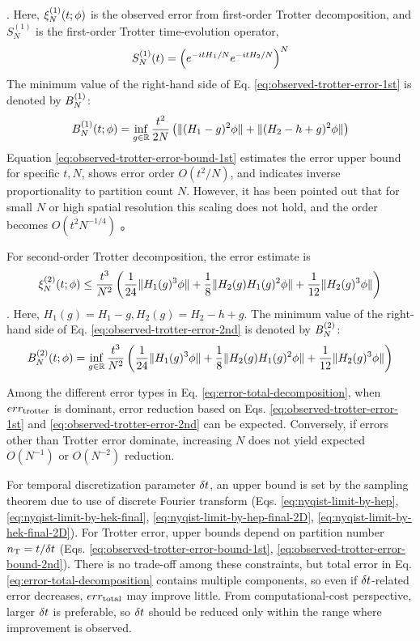 \documentclass[a4paper,11pt]{article}
\begin{document}
\cite{Burgarth2024.PhysRevResearch.6.043155}. Here,
$\xi_{N}^{(1)}(t;\phi)$ is the observed error from first-order Trotter
decomposition, and $S_N^{(1)}$ is the first-order Trotter time-evolution
operator,
\begin{equation}
    S_{N}^{(1)}(t)=\left(e^{-i{tH}_1/N}e^{-itH_2/N}\right)^N
\end{equation}
The minimum value of the right-hand side of
Eq. \eqref{eq:observed-trotter-error-1st} is denoted by $B_{N}^{(1)}$:
\begin{equation}
B_{N}^{(1)}(t;\phi)=\inf_{g\in\mathbb{R}}\frac{t^2}{2N}
    \left(\|(H_1-g)^2\phi\|+\|(H_2-h+g)^2\phi\|\right)
\label{eq:observed-trotter-error-bound-1st}
\end{equation}
Equation \eqref{eq:observed-trotter-error-bound-1st} estimates the error upper
bound for specific $t,N$, shows error order $O(t^2/N)$, and indicates inverse
proportionality to partition count $N$. However, it has been pointed out that
for small $N$ or high spatial resolution this scaling does not hold, and the
order becomes $O(t^2 N^{-1/4})$
\cite{Burgarth2024.PhysRevResearch.6.043155}。

For second-order Trotter decomposition, the error estimate is
\begin{equation}
  \xi_{N}^{(2)}(t;\phi)\leq\frac{t^3}{N^2}\left(\frac{1}{24}\|H_1(g)^3\phi\| + \frac{1}{8}\|H_2(g)H_1(g)^2\phi\|
  +\frac{1}{12}\|H_2(g)^3\phi\|\right)
    \label{eq:observed-trotter-error-2nd}
\end{equation}
\cite{Burgarth2024.PhysRevResearch.6.043155}. Here,
$H_1(g)=H_1-g,H_2(g)=H_2-h+g$.
The minimum value of the right-hand side of
Eq. \eqref{eq:observed-trotter-error-2nd} is denoted by $B_{N}^{(2)}$:
\begin{equation}
B_{N}^{(2)}(t;\phi)=\inf_{g\in\mathbb{R}}\frac{t^3}{N^2}
    \left(\frac{1}{24}\|H_1(g)^3\phi\| + \frac{1}{8}\|H_2(g)H_1(g)^2\phi\|
  +\frac{1}{12}\|H_2(g)^3\phi\|\right)
\label{eq:observed-trotter-error-bound-2nd}
\end{equation}

Among the different error types in Eq. \eqref{eq:error-total-decomposition},
when $err_{\mathrm{trotter}}$ is dominant, error reduction based on
Eqs. \eqref{eq:observed-trotter-error-1st} and
\eqref{eq:observed-trotter-error-2nd} can be expected. Conversely, if errors
other than Trotter error dominate, increasing $N$ does not yield expected
$O(N^{-1})$ or $O(N^{-2})$ reduction.


For temporal discretization parameter $\delta t$, an upper bound is set by the
sampling theorem due to use of discrete Fourier transform
(Eqs. \eqref{eq:nyqist-limit-by-hep},
\eqref{eq:nyqist-limit-by-hek-final},
\eqref{eq:nyqist-limit-by-hep-final-2D},
\eqref{eq:nyqist-limit-by-hek-final-2D}).
For Trotter error, upper bounds depend on partition number
$n_{\mathrm{T}}=t/\delta t$ (Eqs. \eqref{eq:observed-trotter-error-bound-1st},
\eqref{eq:observed-trotter-error-bound-2nd}).
There is no trade-off among these constraints, but total error in
Eq. \eqref{eq:error-total-decomposition} contains multiple components, so even
if $\delta t$-related error decreases, $err_{\mathrm{total}}$ may improve little.
From computational-cost perspective, larger $\delta t$ is preferable, so
$\delta t$ should be reduced only within the range where improvement is observed.
\end{document}
